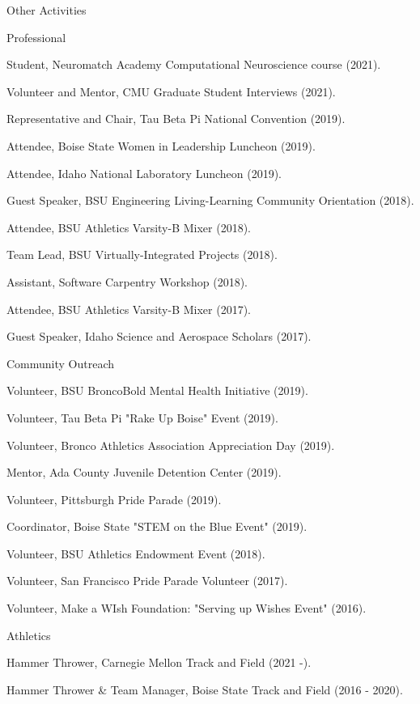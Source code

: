 \documentclass{resume} %
\begin{document}
\begin{rSection}{Other Activities}
\begin{rSubsection2}{Professional}{}{}{}
\item Student, Neuromatch Academy Computational Neuroscience course (2021).
\item Volunteer and Mentor, CMU Graduate Student Interviews (2021).
\item Representative and Chair, Tau Beta Pi National Convention (2019). 
\item Attendee, Boise State Women in Leadership Luncheon (2019).
\item Attendee, Idaho National Laboratory Luncheon (2019).
\item Guest Speaker, BSU Engineering Living-Learning Community Orientation (2018).
\item Attendee, BSU Athletics Varsity-B Mixer (2018).
\item Team Lead, BSU Virtually-Integrated Projects (2018).
\item Assistant, Software Carpentry Workshop (2018).
\item Attendee, BSU Athletics Varsity-B Mixer (2017).
\item Guest Speaker, Idaho Science and Aerospace Scholars (2017).
\end{rSubsection2}
\begin{rSubsection2}{Community Outreach}{}{}{}
\item Volunteer, BSU BroncoBold Mental Health Initiative (2019). 
\item Volunteer, Tau Beta Pi "Rake Up Boise" Event (2019).
\item Volunteer, Bronco Athletics Association Appreciation Day (2019).
\item Mentor, Ada County Juvenile Detention Center (2019).
\item Volunteer, Pittsburgh Pride Parade (2019).
\item Coordinator, Boise State "STEM on the Blue Event" (2019).
\item Volunteer, BSU Athletics Endowment Event (2018).
\item Volunteer, San Francisco Pride Parade Volunteer (2017).
\item Volunteer, Make a WIsh Foundation: "Serving up Wishes Event" (2016). 
\end{rSubsection2}
\begin{rSubsection2}{Athletics}{}{}{}
\item Hammer Thrower, Carnegie Mellon Track and Field (2021 -).
\item Hammer Thrower \& Team Manager, Boise State Track and Field (2016 - 2020).
\end{rSubsection2}
\end{rSection}
\end{document}

